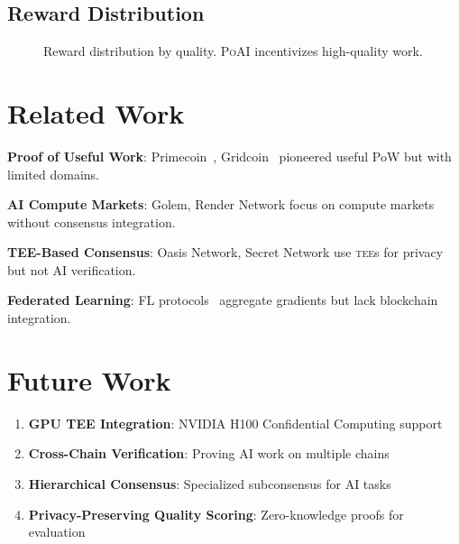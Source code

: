\documentclass[11pt,letterpaper]{article}
\newcommand{\PoAI}{\textsc{PoAI}}
\newcommand{\TEE}{\textsc{tee}}
\begin{document}
\subsection{Reward Distribution}

\begin{figure}[t]
\centering
{}
\caption{Reward distribution by quality. \PoAI{} incentivizes high-quality work.}
\label{fig:rewards}
\end{figure}

\section{Related Work}

\textbf{Proof of Useful Work}: Primecoin~\cite{king2013primecoin}, Gridcoin~\cite{gridcoin2014} pioneered useful PoW but with limited domains.

\textbf{AI Compute Markets}: Golem, Render Network focus on compute markets without consensus integration.

\textbf{TEE-Based Consensus}: Oasis Network, Secret Network use \TEE{}s for privacy but not AI verification.

\textbf{Federated Learning}: FL protocols~\cite{mcmahan2017communication} aggregate gradients but lack blockchain integration.

\section{Future Work}

\begin{enumerate}
    \item \textbf{GPU TEE Integration}: NVIDIA H100 Confidential Computing support
    \item \textbf{Cross-Chain Verification}: Proving AI work on multiple chains
    \item \textbf{Hierarchical Consensus}: Specialized subconsensus for AI tasks
    \item \textbf{Privacy-Preserving Quality Scoring}: Zero-knowledge proofs for evaluation
\end{enumerate}
\end{document}
